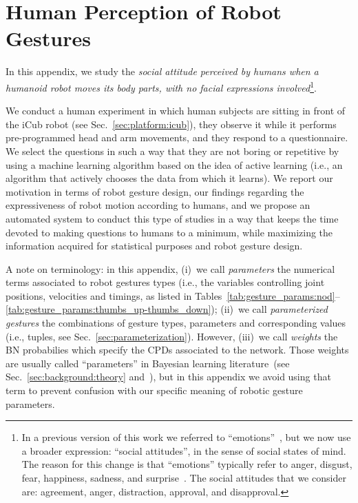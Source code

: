 
\chapter{Human Perception of Robot Gestures}
\label{chap:human_perc_robotgest}

In this appendix, we study the \emph{social attitude perceived by humans when a humanoid robot moves its body parts, with no facial expressions involved}\footnote{In a previous version of this work we referred to ``emotions''~\cite{saponaro:2011:hri}, but we now use a broader expression: ``social attitudes'', in the sense of social states of mind. The reason for this change is that ``emotions'' typically refer to anger, disgust, fear, happiness, sadness, and surprise~\cite{ekman:1972}. The social attitudes that we consider are: agreement, anger, distraction, approval, and disapproval.}.

We conduct a human experiment in which human subjects are sitting in front of the iCub robot (see Sec.~\ref{sec:platform:icub}), they observe it while it performs pre-programmed head and arm movements, and they respond to a questionnaire. We select the questions in such a way that they are not boring or repetitive by using a machine learning algorithm based on the idea of active learning (i.e., an algorithm that actively chooses the data from which it learns). We report our motivation in terms of robot gesture design, our findings regarding the expressiveness of robot motion according to humans, and we propose an automated system to conduct this type of studies in a way that keeps the time devoted to making questions to humans to a minimum, while maximizing the information acquired for statistical purposes and robot gesture design.

A note on terminology: in this appendix,
(i)~we call \emph{parameters} the numerical terms associated to robot gestures types (i.e., the variables controlling joint positions, velocities and timings, as listed in Tables~\ref{tab:gesture_params:nod}--\ref{tab:gesture_params:thumbs_up-thumbs_down});
(ii)~we call \emph{parameterized gestures} the combinations of gesture types, parameters and corresponding values (i.e., \gestparval{} tuples, see Sec.~\ref{sec:parameterization}).
However, (iii)~we call \emph{weights} the \ac{BN} probabilies which specify the \acp{CPD} associated to the network.
Those weights are usually called ``parameters'' in Bayesian learning literature~(see Sec.~\ref{sec:background:theory} and~\cite{tong:2000,bishop:prml,pearl:1988:probabilistic}), but in this appendix we avoid using that term to prevent confusion with our specific meaning of robotic gesture parameters. \label{terminology_parameter_weight}

